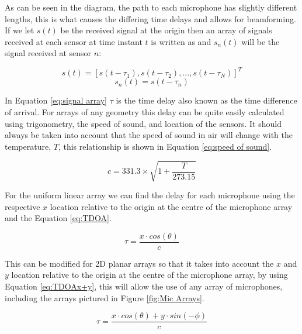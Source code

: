 \documentclass{UoNMCHA}
\numberwithin{equation}{section}
\begin{document}
    As can be seen in the diagram, the path to each microphone has slightly different lengths, this is what causes the differing time delays and allows for beamforming. If we let $s(t)$ be the received signal at the origin then an array of signals received at each sensor at time instant $t$ is written as and $s_n(t)$ will be the signal received at sensor $n$:
    
    \begin{equation}
        s(t) = [s(t-\tau_1), s(t-\tau_2), ..., s(t-\tau_N)]^T
        \label{eq:signal array}
    \end{equation}
    \begin{equation}
        s_n(t) = s(t-\tau_n)
        \label{eq:sensor signal}
    \end{equation}
    
    In Equation \ref{eq:signal array} $\tau$ is the time delay also known as the time difference of arrival. For arrays of any geometry this delay can be quite easily calculated using trigonometry, the speed of sound, and location of the sensors. It should always be taken into account that the speed of sound in air will change with the temperature, $T$, this relationship is shown in Equation \ref{eq:speed of sound}. 
    
    \begin{equation}
        c = 331.3 \times \sqrt{1+\frac{T}{273.15}}
        \label{eq:speed of sound}
    \end{equation}
    
    For the uniform linear array we can find the delay for each microphone using the respective $x$ location relative to the origin at the centre of the microphone array and the Equation \ref{eq:TDOA}.
    
    \begin{equation}
        \tau = \frac{x\cdot cos(\theta)}{c}
        \label{eq:TDOA}
    \end{equation}
    
    This can be modified for 2D planar arrays so that it takes into account the $x$ and $y$ location  relative to the origin at the centre of the microphone array, by using Equation \ref{eq:TDOAx+y}, this will allow the use of any array of microphones, including the arrays pictured in Figure \ref{fig:Mic Arrays}.
    
    \begin{equation}
        \tau = \frac{x \cdot cos(\theta) + y \cdot sin(-\phi)}{c}
        \label{eq:TDOAx+y}
    \end{equation}
    
\end{document}
